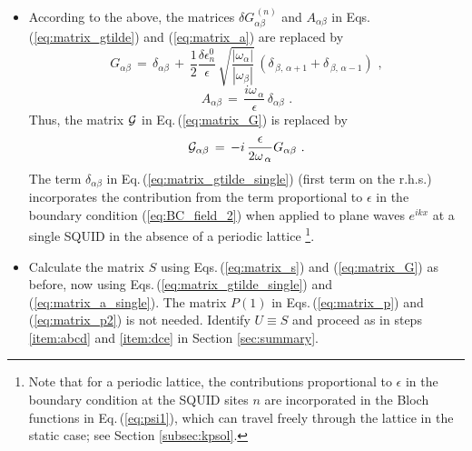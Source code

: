 \begin{itemize}
\item According to the above, 
the matrices $\delta G_{\alpha \beta}^{\,(n)}$ and $A_{\alpha \beta}$
in Eqs.\,(\ref{eq:matrix_gtilde}) and (\ref{eq:matrix_a}) are replaced by
%
\begin{equation} \label{eq:matrix_gtilde_single}
G_{\alpha \beta} \, = \, \delta_{\alpha \beta} \, + \, \frac{1}{2} \frac{\delta \epsilon_n^0}{\epsilon} \, 
\sqrt{\frac{|\omega_{\alpha}|}{|\omega_{\beta}|}} \,
\left(\delta_{\,\beta,\,\alpha+1} + \delta_{\,\beta,\,\alpha-1} \right) \, \, ,
\end{equation}
%
\begin{equation} \label{eq:matrix_a_single}
A_{\alpha \beta} \, = \, \frac{i \omega_{\,\alpha}}{\epsilon} \, \delta_{\alpha \beta} \, \, .
\end{equation}
%
Thus, the matrix ${\cal G}$ in Eq.\,(\ref{eq:matrix_G}) is replaced by
%
\begin{equation} \label{eq:matrix_G_single}
{\cal G}_{\alpha \beta} \, = \, - i \, \frac{\epsilon}{2 \omega_{\,\alpha}} G_{\alpha \beta} \, \, .  
\end{equation}
%
The term $\delta_{\alpha \beta}$ in Eq.\,(\ref{eq:matrix_gtilde_single}) (first term on the r.h.s.) 
incorporates the contribution from the term proportional to $\epsilon$ in the boundary condition
(\ref{eq:BC_field_2}) when applied to plane waves $e^{i k x}$ at a single SQUID in the absence of 
a periodic lattice
%
\footnote{Note that for a periodic lattice, the contributions proportional to $\epsilon$ 
in the boundary condition at the SQUID sites $n$ are incorporated in the Bloch functions 
in Eq.\,(\ref{eq:psi1}), which can travel freely through the lattice in the static case; 
see Section \ref{subsec:kpsol}.}.

\item Calculate the matrix $S$ using Eqs.\,(\ref{eq:matrix_s}) and (\ref{eq:matrix_G})
as before, now using Eqs.\,(\ref{eq:matrix_gtilde_single}) and (\ref{eq:matrix_a_single}).
The matrix $P(1)$ in Eqs.\,(\ref{eq:matrix_p}) and (\ref{eq:matrix_p2}) is not needed.
Identify $U \equiv S$ and proceed as in steps \ref{item:abcd} and \ref{item:dce} in 
Section \ref{sec:summary}.

 \end{itemize}

